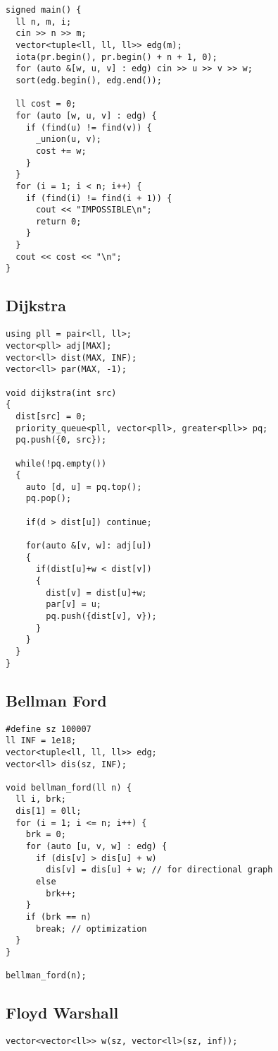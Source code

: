 \documentclass[FSZ,a4paper,onesided]{article}
\begin{document}
\begin{multicols*}{\COLS}
\begin{lstlisting}
signed main() {
  ll n, m, i;
  cin >> n >> m;
  vector<tuple<ll, ll, ll>> edg(m);
  iota(pr.begin(), pr.begin() + n + 1, 0);
  for (auto &[w, u, v] : edg) cin >> u >> v >> w;
  sort(edg.begin(), edg.end());

  ll cost = 0;
  for (auto [w, u, v] : edg) {
    if (find(u) != find(v)) {
      _union(u, v);
      cost += w;
    }
  }
  for (i = 1; i < n; i++) {
    if (find(i) != find(i + 1)) {
      cout << "IMPOSSIBLE\n";
      return 0;
    }
  }
  cout << cost << "\n";
}
\end{lstlisting}
\subsection{Dijkstra}
\begin{lstlisting}
using pll = pair<ll, ll>;
vector<pll> adj[MAX];
vector<ll> dist(MAX, INF);
vector<ll> par(MAX, -1);

void dijkstra(int src)
{
  dist[src] = 0;
  priority_queue<pll, vector<pll>, greater<pll>> pq;
  pq.push({0, src});

  while(!pq.empty())
  {
    auto [d, u] = pq.top();
    pq.pop();

    if(d > dist[u]) continue;

    for(auto &[v, w]: adj[u])
    {
      if(dist[u]+w < dist[v])
      {
        dist[v] = dist[u]+w;
        par[v] = u; 
        pq.push({dist[v], v});
      }
    }
  }
}
\end{lstlisting}
\subsection{Bellman Ford}
\begin{lstlisting}
#define sz 100007
ll INF = 1e18;
vector<tuple<ll, ll, ll>> edg;
vector<ll> dis(sz, INF);

void bellman_ford(ll n) {
  ll i, brk;
  dis[1] = 0ll;
  for (i = 1; i <= n; i++) {
    brk = 0;
    for (auto [u, v, w] : edg) {
      if (dis[v] > dis[u] + w)
        dis[v] = dis[u] + w; // for directional graph
      else
        brk++;
    }
    if (brk == n)
      break; // optimization
  }
}

bellman_ford(n);
\end{lstlisting}
\subsection{Floyd Warshall}
\begin{lstlisting}
vector<vector<ll>> w(sz, vector<ll>(sz, inf));


\end{lstlisting}
\end{multicols*}
\end{document}
